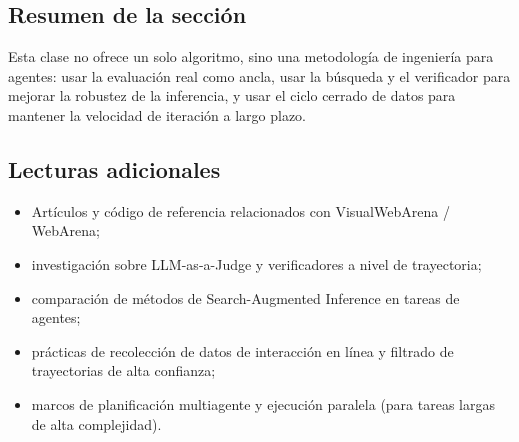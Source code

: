 \subsection{Resumen de la sección}
Esta clase no ofrece un solo algoritmo, sino una metodología de ingeniería para agentes: usar la evaluación real como ancla, usar la búsqueda y el verificador para mejorar la robustez de la inferencia, y usar el ciclo cerrado de datos para mantener la velocidad de iteración a largo plazo.

\subsection{Lecturas adicionales}
\begin{itemize}
    \item Artículos y código de referencia relacionados con VisualWebArena / WebArena;
    \item investigación sobre LLM-as-a-Judge y verificadores a nivel de trayectoria;
    \item comparación de métodos de Search-Augmented Inference en tareas de agentes;
    \item prácticas de recolección de datos de interacción en línea y filtrado de trayectorias de alta confianza;
    \item marcos de planificación multiagente y ejecución paralela (para tareas largas de alta complejidad).
\end{itemize}


